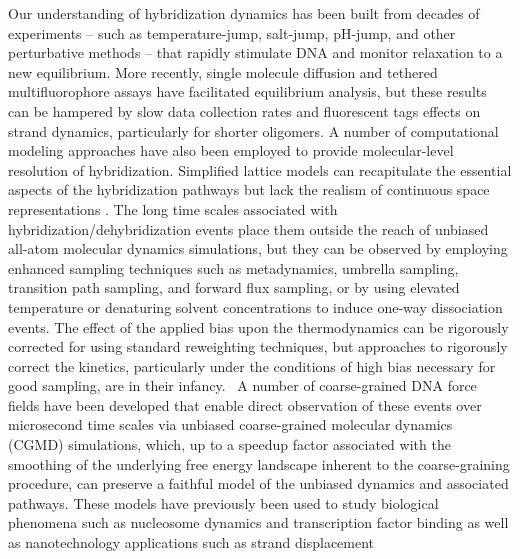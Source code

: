 \documentclass[journal=jpcbfk,manuscript=article]{achemso}
\begin{document}
Our understanding of hybridization dynamics has been built from decades of experiments -- such as temperature-jump, salt-jump, pH-jump, and other perturbative methods -- that rapidly stimulate DNA and monitor relaxation to a new equilibrium.\citep{Morrison1993SensitiveSolution, Wetmur1968KineticsDNA, Craig1971RelaxationOligonucleotides, Porschke1973ThermodynamicsPairs, Williams1989LaserDGCATGC, Narayanan2012ExploringMixing, Chen2007InfluenceHybridization, Sanstead2018DirectDehybridization} More recently, single molecule diffusion and tethered multifluorophore assays have facilitated equilibrium analysis, but these results can be hampered by slow data collection rates and fluorescent tags effects on strand dynamics, particularly for shorter oligomers.\citep{Liu20173DSolution,  Schickinger2018TetheredHelices, Chen2008Base-by-baseSpectroscopy, Dupuis2013Single-moleculeHelices} A number of computational modeling approaches have also been employed to provide molecular-level resolution of hybridization. Simplified lattice models can recapitulate the essential aspects of the hybridization pathways but lack the realism of continuous space representations \citep{Araque2016LatticeCooperativity, Phys2019}. The long time scales associated with hybridization/dehybridization events place them outside the reach of unbiased all-atom molecular dynamics simulations,\citep{Phys2014} but they can be observed by employing enhanced sampling techniques such as metadynamics, umbrella sampling,  transition path sampling, and forward flux sampling,\citep{Piana2007AtomisticTransition, Zerze2021ThermodynamicsSimulations, Hinckley2013AnHybridization, Schmitt2013ExploringSurface, Sambriski2009, Sambriski2009SequencePathways, Hoefert2011MolecularOligonucleotides,Romano2013DNADependence, Hinckley2014Coarse-grainedEffects} or by using elevated temperature or denaturing solvent concentrations to induce one-way dissociation events.\citep{Wong2008TheSimulations, Perez2010Real-timeUnfolding} The effect of the applied bias upon the thermodynamics can be rigorously corrected for using standard reweighting techniques, but approaches to rigorously correct the kinetics, particularly under the conditions of high bias necessary for good sampling, are in their infancy.~\citep{Prinz2011OptimalDynamics, Chodera2011DynamicalTemperatures, Stelzl2017DynamicSimulations, Donati2017GirsanovModels, Donati2018GirsanovSimulations, Quer2018ANCOORDINATES} A number of coarse-grained DNA force fields have been developed that enable direct observation of these events over microsecond time scales via unbiased coarse-grained molecular dynamics (CGMD) simulations, \citep{Romano2013DNADependence, Hinckley2013AnHybridization, Maciejczyk2014DNAModel, Markegard2015, Dans2016MultiscaleDNA} which, up to a speedup factor associated with the smoothing of the underlying free energy landscape inherent to the coarse-graining procedure, can preserve a faithful model of the unbiased dynamics and associated pathways. These models have previously been used to study biological phenomena such as nucleosome dynamics\citep{Lequieu2016Tension-dependentUnwrapping, Lequieu2017InSliding} and transcription factor binding \cite{Terakawa2015P53Simulations, Tan2018DynamicData} as well as nanotechnology applications such as strand displacement 
\end{document}
